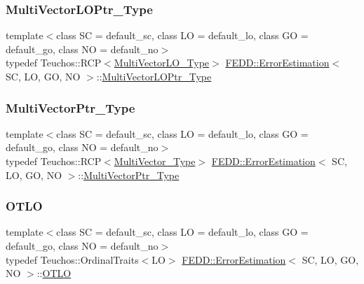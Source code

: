 \subsubsection{\texorpdfstring{Multi\+Vector\+L\+O\+Ptr\+\_\+\+Type}{MultiVectorLOPtr\_Type}}
{\footnotesize\ttfamily template$<$class SC = default\+\_\+sc, class LO = default\+\_\+lo, class GO = default\+\_\+go, class NO = default\+\_\+no$>$ \\
typedef Teuchos\+::\+R\+CP$<$\hyperlink{classFEDD_1_1ErrorEstimation_aabbb5539b0703f8c6c04fb6595397631}{Multi\+Vector\+L\+O\+\_\+\+Type}$>$ \hyperlink{classFEDD_1_1ErrorEstimation}{F\+E\+D\+D\+::\+Error\+Estimation}$<$ SC, LO, GO, NO $>$\+::\hyperlink{classFEDD_1_1ErrorEstimation_a00ba9c6b6b8c876b403e9c3a3c036151}{Multi\+Vector\+L\+O\+Ptr\+\_\+\+Type}}

\mbox{\label{classFEDD_1_1ErrorEstimation_a5882ff373bf8c409b407b4fd1f42bda0}} 
\subsubsection{\texorpdfstring{Multi\+Vector\+Ptr\+\_\+\+Type}{MultiVectorPtr\_Type}}
{\footnotesize\ttfamily template$<$class SC = default\+\_\+sc, class LO = default\+\_\+lo, class GO = default\+\_\+go, class NO = default\+\_\+no$>$ \\
typedef Teuchos\+::\+R\+CP$<$\hyperlink{classFEDD_1_1ErrorEstimation_a1c6fa9610a1e5e887e5a88ab33f1c792}{Multi\+Vector\+\_\+\+Type}$>$ \hyperlink{classFEDD_1_1ErrorEstimation}{F\+E\+D\+D\+::\+Error\+Estimation}$<$ SC, LO, GO, NO $>$\+::\hyperlink{classFEDD_1_1ErrorEstimation_a5882ff373bf8c409b407b4fd1f42bda0}{Multi\+Vector\+Ptr\+\_\+\+Type}}

\mbox{\label{classFEDD_1_1ErrorEstimation_a1b356a52ad66b086de32457a51104038}} 
\subsubsection{\texorpdfstring{O\+T\+LO}{OTLO}}
{\footnotesize\ttfamily template$<$class SC = default\+\_\+sc, class LO = default\+\_\+lo, class GO = default\+\_\+go, class NO = default\+\_\+no$>$ \\
typedef Teuchos\+::\+Ordinal\+Traits$<$LO$>$ \hyperlink{classFEDD_1_1ErrorEstimation}{F\+E\+D\+D\+::\+Error\+Estimation}$<$ SC, LO, GO, NO $>$\+::\hyperlink{classFEDD_1_1ErrorEstimation_a1b356a52ad66b086de32457a51104038}{O\+T\+LO}}

